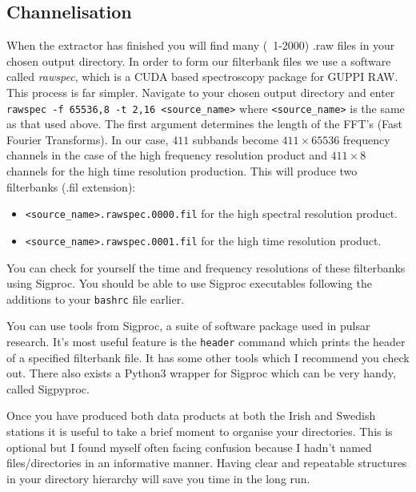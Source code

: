 \documentclass[12pt, onepage]{article}
\numberwithin{equation}{section} %
\begin{document}
\subsection{Channelisation}
When the extractor has finished you will find many (~1-2000) .raw files in your chosen output directory. In order to form our filterbank files we use a software called \textit{rawspec}, which is a CUDA based spectroscopy package for GUPPI RAW. This process is far simpler. Navigate to your chosen output directory and enter \texttt{rawspec -f 65536,8 -t 2,16 <source\_name>} where \texttt{<source\_name>} is the same as that used above. The first argument determines the length of the FFT's (Fast Fourier Transforms). In our case, $411$ subbands become $411\times65536$ frequency channels in the case of the high frequency resolution product and $411\times8$ channels for the high time resolution production. This will produce two filterbanks (.fil extension):
\begin{itemize}
    \item \texttt{<source\_name>.rawspec.0000.fil} for the high spectral resolution product.
    \item \texttt{<source\_name>.rawspec.0001.fil} for the high time resolution product.
\end{itemize}
You can check for yourself the time and frequency resolutions of these filterbanks using Sigproc. You should be able to use Sigproc executables following the additions to your \texttt{bashrc} file earlier. 

You can use tools from Sigproc, a suite of software package used in pulsar research. It's most useful feature is the \texttt{header} command which prints the header of a specified filterbank file. It has some other tools which I recommend you check out. There also exists a Python3 wrapper for Sigproc which can be very handy, called Sigpyproc.

Once you have produced both data products at both the Irish and Swedish stations it is useful to take a brief moment to organise your directories. This is optional but I found myself often facing confusion because I hadn't named files/directories in an informative manner. Having clear and repeatable structures in your directory hierarchy will save you time in the long run.
\newpage
\end{document}
